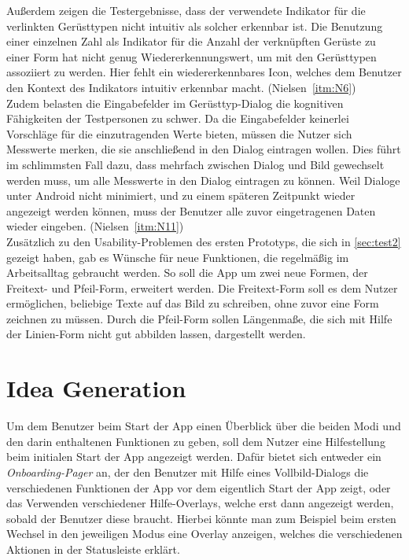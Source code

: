 Außerdem zeigen die Testergebnisse, dass der verwendete Indikator für die verlinkten Gerüsttypen nicht intuitiv als solcher erkennbar ist.
Die Benutzung einer einzelnen Zahl als Indikator für die Anzahl der verknüpften Gerüste zu einer Form hat nicht genug Wiedererkennungswert, um mit den Gerüsttypen assoziiert zu werden.
Hier fehlt ein wiedererkennbares Icon, welches dem Benutzer den Kontext des Indikators intuitiv erkennbar macht.
(Nielsen~\autoref{itm:N6}) \\

Zudem belasten die Eingabefelder im Gerüsttyp-Dialog die kognitiven Fähigkeiten der Testpersonen zu schwer.
Da die Eingabefelder keinerlei Vorschläge für die einzutragenden Werte bieten, müssen die Nutzer sich Messwerte merken, die sie anschließend in den Dialog eintragen wollen.
Dies führt im schlimmsten Fall dazu, dass mehrfach zwischen Dialog und Bild gewechselt werden muss, um alle Messwerte in den Dialog eintragen zu können.
Weil Dialoge unter Android nicht minimiert, und zu einem späteren Zeitpunkt wieder angezeigt werden können, muss der Benutzer alle zuvor eingetragenen Daten wieder eingeben.
(Nielsen~\autoref{itm:N11}) \\

Zusätzlich zu den Usability-Problemen des ersten Prototyps, die sich in \autoref{sec:test2} gezeigt haben, gab es Wünsche für neue Funktionen, die regelmäßig im Arbeitsalltag gebraucht werden.
So soll die App um zwei neue Formen, der Freitext- und Pfeil-Form, erweitert werden.
Die Freitext-Form soll es dem Nutzer ermöglichen, beliebige Texte auf das Bild zu schreiben, ohne zuvor eine Form zeichnen zu müssen. Durch die Pfeil-Form sollen Längenmaße, die sich mit Hilfe der Linien-Form nicht gut abbilden lassen, dargestellt werden. \\

\section{Idea Generation}\label{sec:idea3}
Um dem Benutzer beim Start der App einen Überblick über die beiden Modi und den darin enthaltenen Funktionen zu geben, soll dem Nutzer eine Hilfestellung beim initialen Start der App angezeigt werden.
Dafür bietet sich entweder ein \emph{Onboarding-Pager} an, der den Benutzer mit Hilfe eines Vollbild-Dialogs die verschiedenen Funktionen der App vor dem eigentlich Start der App zeigt, oder das Verwenden verschiedener Hilfe-Overlays, welche erst dann angezeigt werden, sobald der Benutzer diese braucht.
Hierbei könnte man zum Beispiel beim ersten Wechsel in den jeweiligen Modus eine Overlay anzeigen, welches die verschiedenen Aktionen in der Statusleiste erklärt. \\

